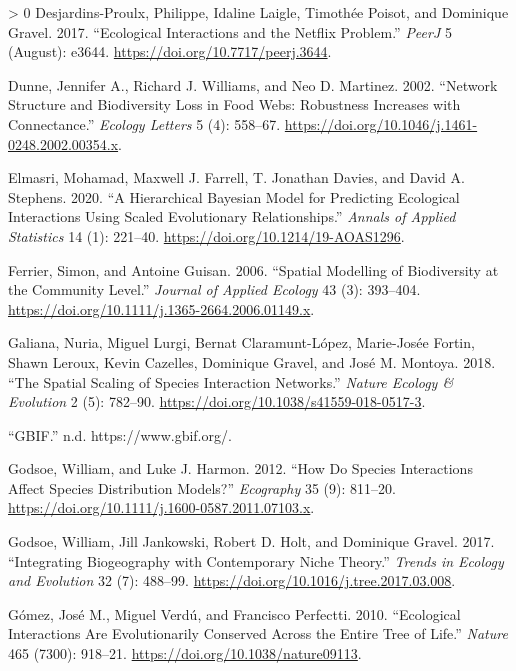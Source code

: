 \documentclass[11pt]{article}
\newlength{\cslhangindent}
\newenvironment{CSLReferences}[3] %
 {%
  \setlength{\parindent}{0pt}
  \ifodd #1 \everypar{\setlength{\hangindent}{\cslhangindent}}\ignorespaces\fi
  \ifnum #2 > 0
  \setlength{\parskip}{#2\baselineskip}
  \fi
 }%
 {}
\begin{document}
\begin{CSLReferences}{1}{0}
\leavevmode\hypertarget{ref-Desjardins-Proulx2017EcoInt}{}%
Desjardins-Proulx, Philippe, Idaline Laigle, Timothée Poisot, and
Dominique Gravel. 2017. {``Ecological Interactions and the Netflix
Problem.''} \emph{PeerJ} 5 (August): e3644.
\url{https://doi.org/10.7717/peerj.3644}.

\leavevmode\hypertarget{ref-Dunne2002NetStr}{}%
Dunne, Jennifer A., Richard J. Williams, and Neo D. Martinez. 2002.
{``Network Structure and Biodiversity Loss in Food Webs: Robustness
Increases with Connectance.''} \emph{Ecology Letters} 5 (4): 558--67.
\url{https://doi.org/10.1046/j.1461-0248.2002.00354.x}.

\leavevmode\hypertarget{ref-Elmasri2020HieBay}{}%
Elmasri, Mohamad, Maxwell J. Farrell, T. Jonathan Davies, and David A.
Stephens. 2020. {``A Hierarchical Bayesian Model for Predicting
Ecological Interactions Using Scaled Evolutionary Relationships.''}
\emph{Annals of Applied Statistics} 14 (1): 221--40.
\url{https://doi.org/10.1214/19-AOAS1296}.

\leavevmode\hypertarget{ref-Ferrier2006SpaMod}{}%
Ferrier, Simon, and Antoine Guisan. 2006. {``Spatial Modelling of
Biodiversity at the Community Level.''} \emph{Journal of Applied
Ecology} 43 (3): 393--404.
\url{https://doi.org/10.1111/j.1365-2664.2006.01149.x}.

\leavevmode\hypertarget{ref-Galiana2018SpaSca}{}%
Galiana, Nuria, Miguel Lurgi, Bernat Claramunt-López, Marie-Josée
Fortin, Shawn Leroux, Kevin Cazelles, Dominique Gravel, and José M.
Montoya. 2018. {``The Spatial Scaling of Species Interaction
Networks.''} \emph{Nature Ecology \& Evolution} 2 (5): 782--90.
\url{https://doi.org/10.1038/s41559-018-0517-3}.

\leavevmode\hypertarget{ref-Gbi}{}%
{``GBIF.''} n.d. https://www.gbif.org/.

\leavevmode\hypertarget{ref-Godsoe2012HowSpe}{}%
Godsoe, William, and Luke J. Harmon. 2012. {``How Do Species
Interactions Affect Species Distribution Models?''} \emph{Ecography} 35
(9): 811--20. \url{https://doi.org/10.1111/j.1600-0587.2011.07103.x}.

\leavevmode\hypertarget{ref-Godsoe2017IntBio}{}%
Godsoe, William, Jill Jankowski, Robert D. Holt, and Dominique Gravel.
2017. {``Integrating Biogeography with Contemporary Niche Theory.''}
\emph{Trends in Ecology and Evolution} 32 (7): 488--99.
\url{https://doi.org/10.1016/j.tree.2017.03.008}.

\leavevmode\hypertarget{ref-Gomez2010EcoInt}{}%
Gómez, José M., Miguel Verdú, and Francisco Perfectti. 2010.
{``Ecological Interactions Are Evolutionarily Conserved Across the
Entire Tree of Life.''} \emph{Nature} 465 (7300): 918--21.
\url{https://doi.org/10.1038/nature09113}.


\end{CSLReferences}
\end{document}
